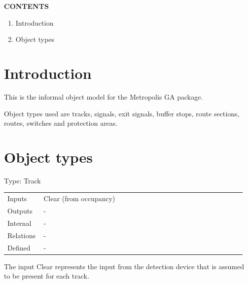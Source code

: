 \documentclass[10pt,a4paper]{article}
\makeatletter
\newcommand{\lab}[1]{\textcolor{Muted}{#1}}
\newenvironment{typerows}
  {\renewcommand{\arraystretch}{1.25}\small
   \begin{tabular}{@{}>{\raggedright\arraybackslash}p{0.14\linewidth}>{\raggedright\arraybackslash}p{0.82\linewidth}@{}}}
  {\end{tabular}}
\makeatother
\begin{document}
\vspace{4mm}
\begin{tcolorbox}[
  colback=PanelGray,colframe=PanelGray,boxrule=0pt,arc=2mm,
  left=4mm,right=4mm,top=3mm,bottom=2.5mm]
  {\color{Muted}\bfseries\fontsize{7.5}{9}\selectfont CONTENTS\par}
  \vspace{2mm}
  \begin{enumerate}[label=\textcolor{MetroOrange}{\bfseries\arabic*.},
    leftmargin=5mm,labelsep=2mm,itemsep=2.5mm,topsep=0pt,parsep=0pt]
    \item Introduction
    \item Object types
  \end{enumerate}
\end{tcolorbox}

\newpage

\section{Introduction}
This is the informal object model for the Metropolis GA package.

Object types used are tracks, signals, exit signals, buffer stops, route sections, routes, switches and protection areas.

\vspace{6mm}
\section{Object types}

\begin{typecard}{Type: Track}
\begin{typerows}
\lab{Inputs} & Clear (from occupancy) \\
\lab{Outputs} & - \\
\lab{Internal} & - \\
\lab{Relations} & - \\
\lab{Defined} & - \\
\end{typerows}
\end{typecard}
The input Clear represents the input from the detection device that is assumed to be present for each track.
\end{document}
